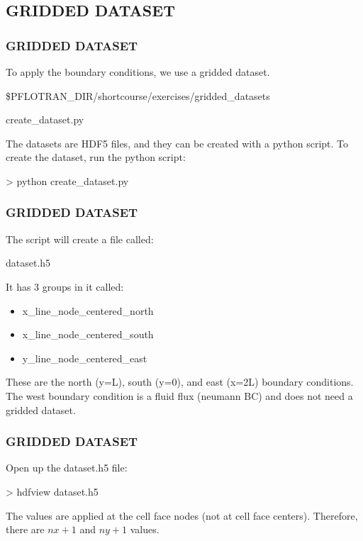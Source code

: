 \documentclass{beamer}
\begin{document}
\subsection{GRIDDED DATASET}

\begin{frame}\frametitle{GRIDDED DATASET}

To apply the boundary conditions, we use a gridded dataset.

\begin{semiverbatim}
\$PFLOTRAN_DIR/shortcourse/exercises/gridded_datasets

create_dataset.py
\end{semiverbatim}

The datasets are HDF5 files, and they can be created with a python script.
To create the dataset, run the python script:

\begin{semiverbatim}
> python create_dataset.py
\end{semiverbatim}

\end{frame}

\begin{frame}\frametitle{GRIDDED DATASET}

The script will create a file called:

\begin{semiverbatim}
dataset.h5
\end{semiverbatim}

It has 3 groups in it called:
\begin{itemize}
  \item x\_line\_node\_centered\_north
  \item x\_line\_node\_centered\_south
  \item y\_line\_node\_centered\_east
\end{itemize}

These are the north (y=L), south (y=0), and east (x=2L) boundary conditions.
The west boundary condition is a fluid flux (neumann BC) and does not need a
gridded dataset.
\end{frame}

\begin{frame}\frametitle{GRIDDED DATASET}

Open up the dataset.h5 file:

\begin{semiverbatim}
> hdfview dataset.h5
\end{semiverbatim}

The values are applied at the cell face nodes (not at cell face centers).
Therefore, there are $nx + 1$ and $ny + 1$ values.

\end{frame}
\end{document}
